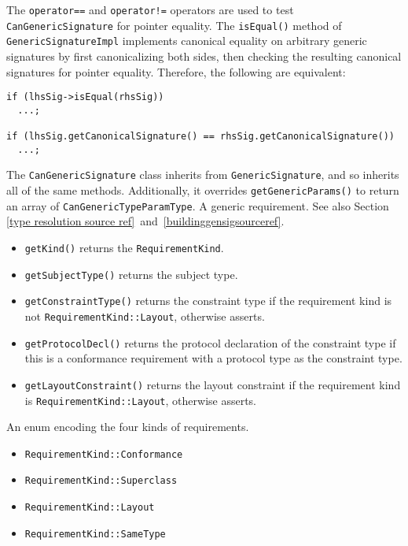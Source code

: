 \documentclass[../generics]{subfiles}
\begin{document}
The \texttt{operator==} and \texttt{operator!=} operators are used to test \texttt{CanGenericSignature} for pointer equality. The \texttt{isEqual()} method of \texttt{GenericSignatureImpl} implements canonical equality on arbitrary generic signatures by first canonicalizing both sides, then checking the resulting canonical signatures for pointer equality. Therefore, the following are equivalent:
\begin{Verbatim}
if (lhsSig->isEqual(rhsSig))
  ...;

if (lhsSig.getCanonicalSignature() == rhsSig.getCanonicalSignature())
  ...;
\end{Verbatim}
The \texttt{CanGenericSignature} class inherits from \texttt{GenericSignature}, and so inherits all of the same methods. Additionally, it overrides \texttt{getGenericParams()} to return an array of \texttt{CanGenericTypeParamType}.
A generic requirement. See also Section \ref{type resolution source ref}~and~\ref{buildinggensigsourceref}.
\begin{itemize}
\item \texttt{getKind()} returns the \texttt{RequirementKind}.
\item \texttt{getSubjectType()} returns the subject type.
\item \texttt{getConstraintType()} returns the constraint type if the requirement kind is not \texttt{RequirementKind::Layout}, otherwise asserts.
\item \texttt{getProtocolDecl()} returns the protocol declaration of the constraint type if this is a conformance requirement with a protocol type as the constraint type.
\item \texttt{getLayoutConstraint()} returns the layout constraint if the requirement kind is \texttt{RequirementKind::Layout}, otherwise asserts.
\end{itemize}

An enum encoding the four kinds of requirements.
\begin{itemize}
\item \texttt{RequirementKind::Conformance}
\item \texttt{RequirementKind::Superclass}
\item \texttt{RequirementKind::Layout}
\item \texttt{RequirementKind::SameType}
\end{itemize}
\end{document}
